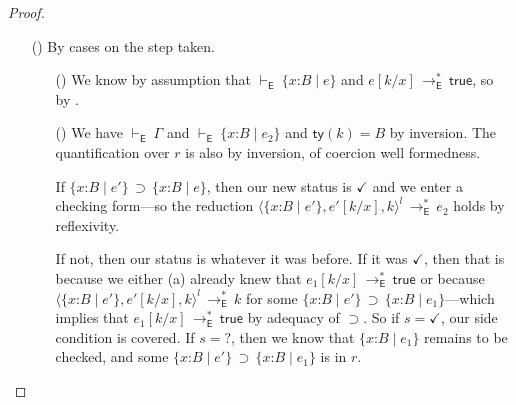\documentclass[9pt]{extarticle}
\newcommand{\ottnt}[1]{\mathit{#1}}
\newcommand{\ottsym}[1]{#1}
\begin{document}
\begin{lemma}
\begin{proof}
{\begin{itemize}
    \item[(\T{Stack})] By cases on the step taken.
      \begin{itemize}
      \item[(\E{StackDone})] We know by assumption that $ \mathord{  \vdash _{  \mathsf{E}  } }~  \{ \mathit{x} \mathord{:} \ottnt{B} \mathrel{\mid} \ottnt{e} \}  $ and $ \ottnt{e}  [  \ottnt{k} / \mathit{x}  ]  \,  \longrightarrow ^{*}_{  \mathsf{E}  }  \,  \mathsf{true} $, so by .

      \item[(\E{StackPop})] We have $ \mathord{  \vdash _{  \mathsf{E}  } }~ \Gamma $ and $ \mathord{  \vdash _{  \mathsf{E}  } }~  \{ \mathit{x} \mathord{:} \ottnt{B} \mathrel{\mid} \ottnt{e_{{\mathrm{2}}}} \}  $ and $ \mathsf{ty} ( \ottnt{k} )   \ottsym{=}  \ottnt{B}$ by inversion. The
        quantification over $\ottnt{r}$ is also by inversion, of coercion
        well formedness.

        If $ \{ \mathit{x} \mathord{:} \ottnt{B} \mathrel{\mid} \ottnt{e'} \}  \, \supset \,  \{ \mathit{x} \mathord{:} \ottnt{B} \mathrel{\mid} \ottnt{e} \} $, then our new status is
        $ \mathord{\checkmark} $ and we enter a checking form---so the reduction
        $ \langle   \{ \mathit{x} \mathord{:} \ottnt{B} \mathrel{\mid} \ottnt{e'} \}  ,   \ottnt{e'}  [  \ottnt{k} / \mathit{x}  ]  ,  \ottnt{k}  \rangle^{ \ottnt{l} }  \,  \longrightarrow ^{*}_{  \mathsf{E}  }  \, \ottnt{e_{{\mathrm{2}}}}$ holds by reflexivity.

        If not, then our status is whatever it was before. If it was
        $ \mathord{\checkmark} $, then that is because we either (a) already knew that
        $ \ottnt{e_{{\mathrm{1}}}}  [  \ottnt{k} / \mathit{x}  ]  \,  \longrightarrow ^{*}_{  \mathsf{E}  }  \,  \mathsf{true} $ or because $ \langle   \{ \mathit{x} \mathord{:} \ottnt{B} \mathrel{\mid} \ottnt{e'} \}  ,   \ottnt{e'}  [  \ottnt{k} / \mathit{x}  ]  ,  \ottnt{k}  \rangle^{ \ottnt{l} }  \,  \longrightarrow ^{*}_{  \mathsf{E}  }  \, \ottnt{k}$ for some $ \{ \mathit{x} \mathord{:} \ottnt{B} \mathrel{\mid} \ottnt{e'} \}  \, \supset \,  \{ \mathit{x} \mathord{:} \ottnt{B} \mathrel{\mid} \ottnt{e_{{\mathrm{1}}}} \} $---which
        implies that $ \ottnt{e_{{\mathrm{1}}}}  [  \ottnt{k} / \mathit{x}  ]  \,  \longrightarrow ^{*}_{  \mathsf{E}  }  \,  \mathsf{true} $ by adequacy of
        $ \supset $. So if $\ottnt{s}  \ottsym{=}   \mathord{\checkmark} $, our side
        condition is covered. If $\ottnt{s}  \ottsym{=}   \mathord{?} $, then we know that
        $ \{ \mathit{x} \mathord{:} \ottnt{B} \mathrel{\mid} \ottnt{e_{{\mathrm{1}}}} \} $ remains to be checked, and some $ \{ \mathit{x} \mathord{:} \ottnt{B} \mathrel{\mid} \ottnt{e'} \}  \, \supset \,  \{ \mathit{x} \mathord{:} \ottnt{B} \mathrel{\mid} \ottnt{e_{{\mathrm{1}}}} \} $ is in $\ottnt{r}$.
        

\end{itemize}
\end{itemize}}
\end{proof}
\end{lemma}
\end{document}
